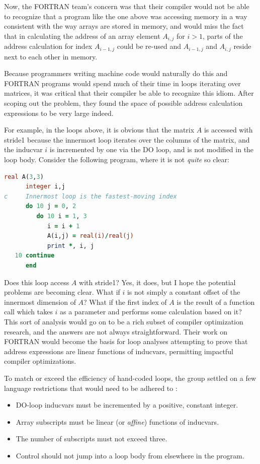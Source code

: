 Now, the FORTRAN team's concern was that their compiler would not be able to recognize
that a program like the one above was accessing memory in a way consistent with the
way arrays are stored in memory, and would miss the fact that in calculating
the address of an array element $A_{i,j}$ for $i > 1$, parts of the address calculation
for index $A_{i-1, j}$ could be re-used and $A_{i-1, j}$ and $A_{i, j}$ reside
next to each other in memory.

Because programmers writing machine code would naturally do this and FORTRAN
programs would spend much of their time in loops iterating over matrices,
it was critical that their compiler be able to recognize this idiom.
After scoping out the problem, they found the space of possible address calculation
expressions to be very large indeed.

For example, in the loops above, it is obvious that the matrix $A$ is accessed
with \gls{stride1} because the innermost loop iterates over the columns of the
matrix, and the \gls{inducvar} $i$ is incremented by one via the DO loop,
and is not modified in the loop body.
Consider the following program, where it is not \textit{quite} so clear:

\begin{lstlisting}[language=fortran,frame=single]
      real A(3,3)
      integer i,j
c     Innermost loop is the fastest-moving index
      do 10 j = 0, 2
         do 10 i = 1, 3
            i = i + 1
            A(i,j) = real(i)/real(j)
            print *, i, j
   10 continue
      end
\end{lstlisting}

Does this loop access $A$ with \gls{stride1}?
Yes, it does, but I hope the potential problems are becoming clear.
What if $i$ is not simply a constant offset of the innermost dimension of $A$?
What if the first index of $A$ is the result of a function call which takes $i$
as a parameter and performs some calculation based on it?
This sort of analysis would go on to be a rich subset of compiler optimization research,
and the answers are not always straightforward.
Their work on FORTRAN would become the basis for loop analyses attempting to prove
that address expressions are linear functions of \gls{inducvar}s,
permitting impactful compiler optimizations.

To match or exceed the efficiency of hand-coded loops, the group settled on a few
language restrictions that would need to be adhered to
\cite{backus_heising_fortran_1964}:

\begin{itemize}
	\item DO-loop \gls{inducvar}s must be incremented by a positive, constant integer.
	\item Array subscripts must be linear (or \textit{affine}) functions of \gls{inducvar}s.
	\item The number of subscripts must not exceed three.
	\item Control should not jump into a loop body from elsewhere in the program.
\end{itemize}


